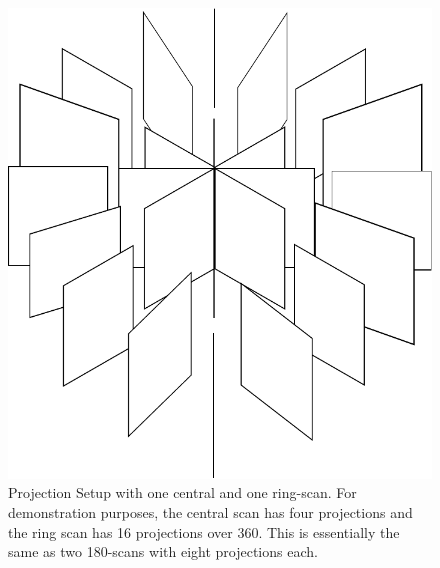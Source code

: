 \begin{figure}[p]
	\centering
		\includegraphics[width=\imsize]{img/projections}
	\caption{Projection Setup with one central and one ring-scan. For demonstration purposes, the central scan has four projections and the ring scan has 16 projections over \unit{360}{\degree}. This is essentially the same as two \unit{180}{\degree}-scans with eight projections each.}
	\label{fig:projections}
\end{figure}